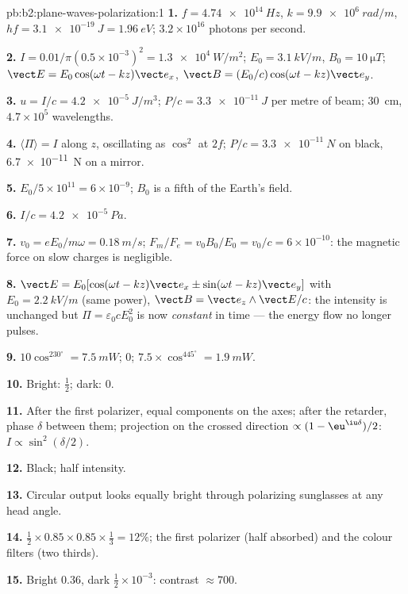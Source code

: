 \begin{solution}{pb:b2:plane-waves-polarization:1}
\textbf{1.} $f = \qty{4.74e14}{Hz}$, $k = \qty{9.9e6}{rad/m}$, $hf = \qty{3.1e-19}{J} =
\qty{1.96}{eV}$; $3.2 \times 10^{16}$ photons per second.

\textbf{2.} $I = 0.01/\pi(0.5 \times 10^{-3})^2 = \qty{1.3e4}{W/m^2}$; $E_0 = \qty{3.1}{kV/m}$,
$B_0 = \qty{10}{\micro T}$; $\vect E = E_0\cos(\omega t - kz)\vect e_x$, $\vect B = (E_0/c)\cos(\omega t
- kz)\vect e_y$.

\textbf{3.} $u = I/c = \qty{4.2e-5}{J/m^3}$; $P/c = \qty{3.3e-11}{J}$ per metre of
beam; \qty{30}{cm}, $4.7 \times 10^5$ wavelengths.

\textbf{4.} $\langle\Pi\rangle = I$ along $z$, oscillating as $\cos^2$ at $2f$;
$P/c = \qty{3.3e-11}{N}$ on black, \qty{6.7e-11}{N} on a mirror.

\textbf{5.} $E_0/5 \times 10^{11} = 6 \times 10^{-9}$; $B_0$ is a fifth of the Earth's
field.

\textbf{6.} $I/c = \qty{4.2e-5}{Pa}$.

\textbf{7.} $v_0 = eE_0/m\omega = \qty{0.18}{m/s}$; $F_m/F_e = v_0B_0/E_0 = v_0/c = 6 \times
10^{-10}$: the magnetic force on slow charges is negligible.

\textbf{8.} $\vect E = E_0[\cos(\omega t - kz)\vect e_x \pm \sin(\omega t - kz)\vect e_y]$ with
$E_0 = \qty{2.2}{kV/m}$ (same power), $\vect B = \vect e_z\wedge\vect E/c$: the
intensity is unchanged but $\Pi = \varepsilon_0cE_0^2$ is now \emph{constant} in
time --- the energy flow no longer pulses.

\textbf{9.} $10\cos^230^\circ = \qty{7.5}{mW}$; $0$; $7.5 \times \cos^445^\circ = \qty{1.9}{mW}$.

\textbf{10.} Bright: $\tfrac12$; dark: $0$.

\textbf{11.} After the first polarizer, equal components on the axes;
after the retarder, phase $\delta$ between them; projection on the crossed
direction $\propto(1 - \eu^{\iu\delta})/2$: $I \propto \sin^2(\delta/2)$.

\textbf{12.} Black; half intensity.

\textbf{13.} Circular output looks equally bright through polarizing
sunglasses at any head angle.

\textbf{14.} $\tfrac12 \times 0.85 \times 0.85 \times \tfrac13 = 12\%$; the first polarizer
(half absorbed) and the colour filters (two thirds).

\textbf{15.} Bright $0.36$, dark $\tfrac12 \times 10^{-3}$: contrast $\approx 700$.


\end{solution}
